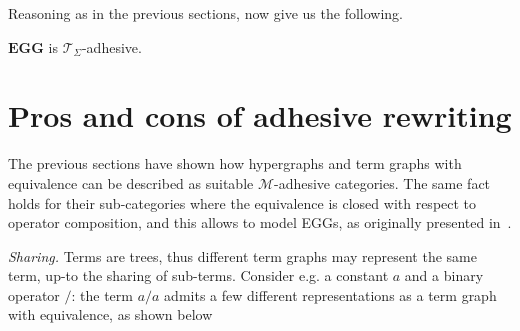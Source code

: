 \documentclass[a4paper,UKenglish,cleveref,pdftex,thm-restate,numberwithinsect]{lipics-v2021}
\newcommand{\eg}[0]{\mathbf{EGG}}
\begin{document}
Reasoning as in the previous sections,  now give us the following. 

\begin{corollary}
	$\eg$ is $\mathcal{T}_\Sigma$-adhesive.
\end{corollary}

\section{Pros and cons of adhesive rewriting}
\label{rewriting}
The previous sections have shown how hypergraphs and term graphs with equivalence
can be described as suitable $\mathcal{M}$-adhesive categories. 
The same fact holds for their sub-categories where the equivalence is
 closed with respect to operator composition, and this allows to
 model EGGs, as originally presented in~\cite{WillseyNWFTP21}. 

\emph{Sharing.} 
Terms are trees, thus different term graphs may represent the same term, up-to the sharing of sub-terms.
Consider e.g. a constant $a$ and a binary operator $/$: the term $a / a$ admits a few different 
representations as a term graph with equivalence, as shown below

%
\end{document}
